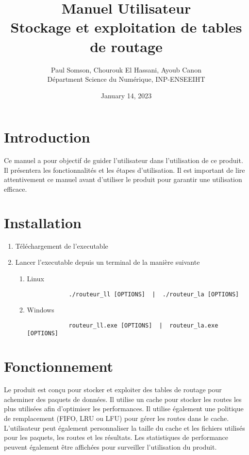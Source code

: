 \documentclass{article}
\title{%
  Manuel Utilisateur \\
  \large Stockage et exploitation de tables de routage}
\author{Paul Somson, Chourouk El Hassani, Ayoub Canon \\
    Départment Science du Numérique, INP-ENSEEIHT}
\date{January 14, 2023}
\begin{document}
\maketitle

\tableofcontents

\section{Introduction}
Ce manuel a pour objectif de guider l'utilisateur dans l'utilisation de ce produit. Il présentera les fonctionnalités et les étapes d'utilisation. Il est important de lire attentivement ce manuel avant d'utiliser le produit pour garantir une utilisation efficace.

\section{Installation}
\begin{enumerate}
    \item Téléchargement de l'executable
    \item Lancer l'executable depuis un terminal de la manière suivante
    \begin{enumerate}
        \item Linux
        \begin{verbatim}
            ./routeur_ll [OPTIONS]  |  ./routeur_la [OPTIONS]
        \end{verbatim}
        \item Windows
        \begin{verbatim}
            routeur_ll.exe [OPTIONS]  |  routeur_la.exe [OPTIONS]
        \end{verbatim}
    \end{enumerate}
\end{enumerate}

\section{Fonctionnement}
Le produit est conçu pour stocker et exploiter des tables de routage pour acheminer des paquets de données. Il utilise un cache pour stocker les routes les plus utilisées afin d'optimiser les performances. Il utilise également une politique de remplacement (FIFO, LRU ou LFU) pour gérer les routes dans le cache. L'utilisateur peut également personnaliser la taille du cache et les fichiers utilisés pour les paquets, les routes et les résultats. Les statistiques de performance peuvent également être affichées pour surveiller l'utilisation du produit.
\end{document}
